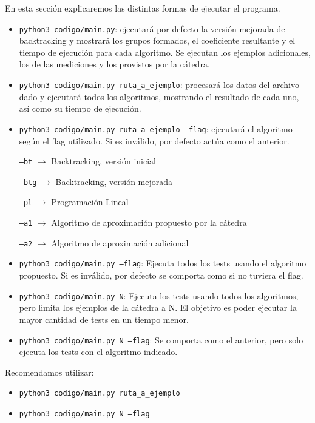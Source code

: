 \documentclass{article}
\begin{document}
En esta sección explicaremos las distintas formas de ejecutar el programa.
\begin{itemize}
    \item \texttt{python3\ codigo/main.py}: ejecutará por defecto la versión mejorada de backtracking y mostrará los grupos formados, el coeficiente resultante y el tiempo de ejecución para cada algoritmo. Se ejecutan los ejemplos adicionales, los de las mediciones y los provistos por la cátedra. 
    \item \texttt{python3\ codigo/main.py\ ruta\_a\_ejemplo}: procesará los datos del archivo dado y ejecutará todos los algoritmos, mostrando el resultado de cada uno, así como su tiempo de ejecución. 
    \item \texttt{python3\ codigo/main.py ruta\_a\_ejemplo\ --flag}: ejecutará el algoritmo según el flag utilizado. Si es inválido, por defecto actúa como el anterior.
    
        \texttt{--bt} $\rightarrow$ Backtracking, versión inicial

        \texttt{--btg} $\rightarrow$ Backtracking, versión mejorada
        
        \texttt{--pl} $\rightarrow$ Programación Lineal
        
        \texttt{--a1} $\rightarrow$ Algoritmo de aproximación propuesto por la cátedra
        
        \texttt{--a2} $\rightarrow$ Algoritmo de aproximación adicional
    \item \texttt{python3\ codigo/main.py\ --flag}: Ejecuta todos los tests usando el algoritmo propuesto. Si es inválido, por defecto se comporta como si no tuviera el flag.

    \item \texttt{python3\ codigo/main.py\ N}: Ejecuta los tests usando todos los algoritmos, pero limita los ejemplos de la cátedra a N. El objetivo es poder ejecutar la mayor cantidad de tests en un tiempo menor.

    \item \texttt{python3\ codigo/main.py\ N\ --flag}: Se comporta como el anterior, pero solo ejecuta los tests con el algoritmo indicado.
        
\end{itemize}

Recomendamos utilizar:
\begin{itemize}
    \item \texttt{python3\ codigo/main.py\ ruta\_a\_ejemplo}
    \item \texttt{python3\ codigo/main.py\ N\ --flag}
\end{itemize}
\end{document}
